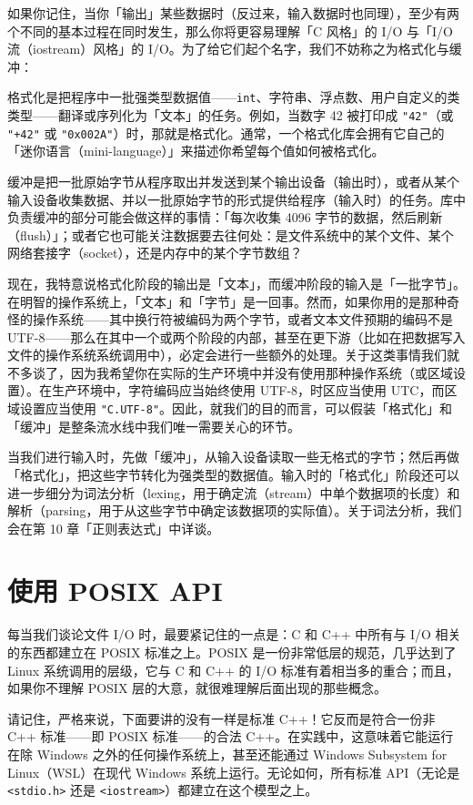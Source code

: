 如果你记住，当你「输出」某些数据时（反过来，输入数据时也同理），至少有两个不同的基本过程在同时发生，那么你将更容易理解「C 风格」的 I/O 与「I/O 流（iostream）风格」的 I/O。为了给它们起个名字，我们不妨称之为格式化与缓冲：

格式化是把程序中一批强类型数据值——\texttt{int}、字符串、浮点数、用户自定义的类类型——翻译或序列化为「文本」的任务。例如，当数字 42 被打印成 \texttt{"42"}（或 \texttt{"+42"} 或 \texttt{"0x002\allowbreak{}A"}）时，那就是格式化。通常，一个格式化库会拥有它自己的「迷你语言（mini-language）」来描述你希望每个值如何被格式化。

缓冲是把一批原始字节从程序取出并发送到某个输出设备（输出时），或者从某个输入设备收集数据、并以一批原始字节的形式提供给程序（输入时）的任务。库中负责缓冲的部分可能会做这样的事情：「每次收集 4096 字节的数据，然后刷新（flush）」；或者它也可能关注数据要去往何处：是文件系统中的某个文件、某个网络套接字（socket），还是内存中的某个字节数组？

现在，我特意说格式化阶段的输出是「文本」，而缓冲阶段的输入是「一批字节」。在明智的操作系统上，「文本」和「字节」是一回事。然而，如果你用的是那种奇怪的操作系统——其中换行符被编码为两个字节，或者文本文件预期的编码不是 UTF-8——那么在其中一个或两个阶段的内部，甚至在更下游（比如在把数据写入文件的操作系统系统调用中），必定会进行一些额外的处理。关于这类事情我们就不多谈了，因为我希望你在实际的生产环境中并没有使用那种操作系统（或区域设置）。在生产环境中，字符编码应当始终使用 UTF-8，时区应当使用 UTC，而区域设置应当使用 \texttt{"C.\allowbreak{}UTF-8"}。因此，就我们的目的而言，可以假装「格式化」和「缓冲」是整条流水线中我们唯一需要关心的环节。

当我们进行输入时，先做「缓冲」，从输入设备读取一些无格式的字节；然后再做「格式化」，把这些字节转化为强类型的数据值。输入时的「格式化」阶段还可以进一步细分为词法分析（lexing，用于确定流（stream）中单个数据项的长度）和解析（parsing，用于从这些字节中确定该数据项的实际值）。关于词法分析，我们会在第 10 章「正则表达式」中详谈。

\section{使用 POSIX API}

每当我们谈论文件 I/O 时，最要紧记住的一点是：C 和 C++ 中所有与 I/O 相关的东西都建立在 POSIX 标准之上。POSIX 是一份非常低层的规范，几乎达到了 Linux 系统调用的层级，它与 C 和 C++ 的 I/O 标准有着相当多的重合；而且，如果你不理解 POSIX 层的大意，就很难理解后面出现的那些概念。

请记住，严格来说，下面要讲的没有一样是标准 C++！它反而是符合一份非 C++ 标准——即 POSIX 标准——的合法 C++。在实践中，这意味着它能运行在除 Windows 之外的任何操作系统上，甚至还能通过 Windows Subsystem for Linux（WSL）在现代 Windows 系统上运行。无论如何，所有标准 API（无论是 \texttt{<stdio.\allowbreak{}h>\allowbreak{}} 还是 \texttt{<iostream>\allowbreak{}}）都建立在这个模型之上。


